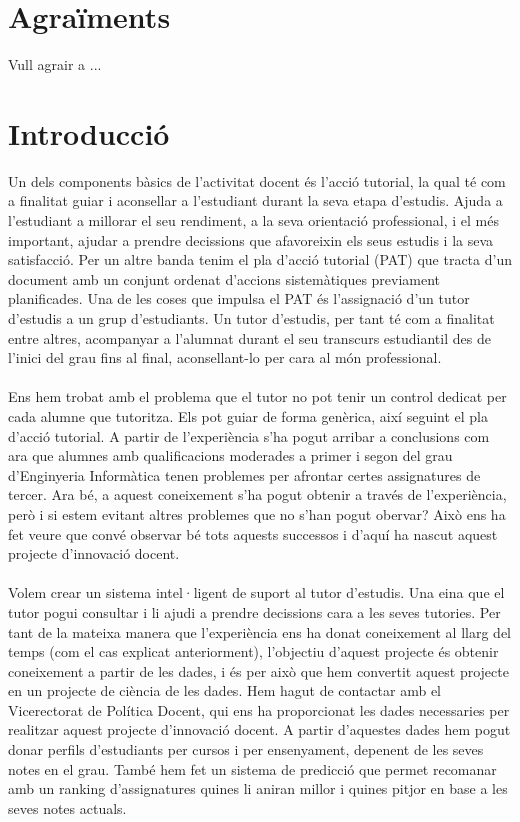 \documentclass[12pt,a4paper,catalan]{article}
\begin{document}
\newpage 

\section*{Agraïments}

Vull agrair a ... 

\newpage
\thispagestyle{empty}
{\hypersetup{linkcolor=black}
	\tableofcontents
}
\thispagestyle{empty}
\newpage

\setcounter{page}{1}


\section{Introducció}
Un dels components bàsics de l'activitat docent és l'acció tutorial, la qual té com a finalitat guiar i aconsellar a l'estudiant durant la seva etapa d'estudis. Ajuda a l'estudiant a millorar el seu rendiment, a la seva orientació professional, i el més important, ajudar a prendre decissions que afavoreixin els seus estudis i la seva satisfacció. Per un altre banda tenim el pla d'acció tutorial (PAT) que tracta d'un document amb un conjunt ordenat d'accions sistemàtiques previament planificades. Una de les coses que impulsa el PAT és l'assignació d'un tutor d'estudis a un grup d'estudiants. Un tutor d'estudis, per tant té com a finalitat entre altres, acompanyar a l'alumnat durant el seu transcurs estudiantil des de l'inici del grau fins al final, aconsellant-lo per cara al món professional.
\\
\\
Ens hem trobat amb el problema que el tutor no pot tenir un control dedicat per cada alumne que tutoritza. Els pot guiar de forma genèrica, així seguint el pla d'acció tutorial. A partir de l'experiència s'ha pogut arribar a conclusions com ara que alumnes amb qualificacions moderades a primer i segon del grau d'Enginyeria Informàtica tenen problemes per afrontar certes assignatures de tercer. Ara bé, a aquest coneixement s'ha pogut obtenir a través de l'experiència, però i si estem evitant altres problemes que no s'han pogut obervar? Això ens ha fet veure que convé observar bé tots aquests successos i d'aquí ha nascut aquest projecte d'innovació docent.
\\
\\
Volem crear un sistema intel·ligent de suport al tutor d'estudis. Una eina que el tutor pogui consultar i li ajudi a prendre decissions cara a les seves tutories. Per tant de la mateixa manera que l'experiència ens ha donat coneixement al llarg del temps (com el cas explicat anteriorment), l'objectiu d'aquest projecte és obtenir coneixement a partir de les dades, i és per això que hem convertit aquest projecte en un projecte de ciència de les dades. Hem hagut de contactar amb el Vicerectorat de Política Docent, qui ens ha proporcionat les dades necessaries per realitzar aquest projecte d'innovació docent. A partir d'aquestes dades hem pogut donar perfils d'estudiants per cursos i per ensenyament, depenent de les seves notes en el grau. També hem fet un sistema de predicció que permet recomanar amb un ranking d'assignatures quines li aniran millor i quines pitjor en base a les seves notes actuals.
\end{document}
